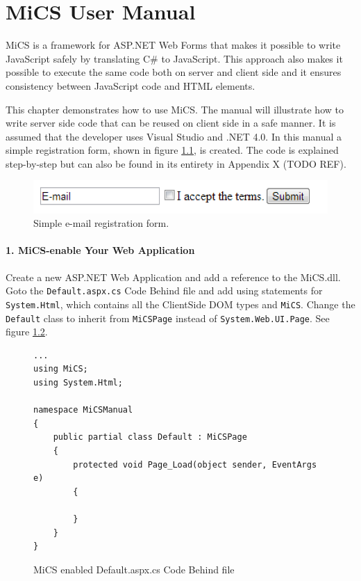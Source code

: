 \chapter{MiCS User Manual}
\label{chap:mics_manual}
MiCS is a framework for ASP.NET Web Forms that makes it possible to write JavaScript safely by translating C\# to JavaScript. This approach also makes it possible to execute the same code both on server and client side and it ensures consistency between JavaScript code and HTML elements.

This chapter demonstrates how to use MiCS. The manual will illustrate how to write server side code that can be reused on client side in a safe manner. It is assumed that the developer uses Visual Studio and .NET 4.0. In this manual a simple registration form, shown in figure \ref{fig:manual_registrationform}, is created. The code is explained step-by-step but can also be found in its entirety in Appendix X (TODO REF).


\begin{figure}[H]
	\begin{center}
		\centerline{\includegraphics[width=12cm]{resources/images/manual_registrationform.png}}
	\end{center}
	\caption{Simple e-mail registration form.}
	\label{fig:manual_registrationform}
\end{figure}


\subsubsection{1. MiCS-enable Your Web Application} %
\label{ssub:mics_enable_your_web_application}
Create a new ASP.NET Web Application and add a reference to the MiCS.dll. Goto the \texttt{Default.aspx.cs} Code Behind file and add using statements for \texttt{System.Html}, which contains all the ClientSide DOM types and \texttt{MiCS}. Change the \texttt{Default} class to inherit from \texttt{MiCSPage} instead of \texttt{System.Web.UI.Page}. See figure \ref{fig:mics_enable_web_application}.
\begin{figure}[H]
\begin{lstlisting}[language=CSharp,classoffset=1,morekeywords={Default,MiCSPage,Button,CheckBox,TextBox,EventArgs,ClientSide,InputElement,Document,CheckBoxElement,Window,MixedSide,Regex}]
...
using MiCS;
using System.Html;

namespace MiCSManual
{
    public partial class Default : MiCSPage
    {
        protected void Page_Load(object sender, EventArgs e)
        {
   
        }
    }
}
\end{lstlisting}
\caption{MiCS enabled Default.aspx.cs Code Behind file}
\label{fig:mics_enable_web_application}
\end{figure}

